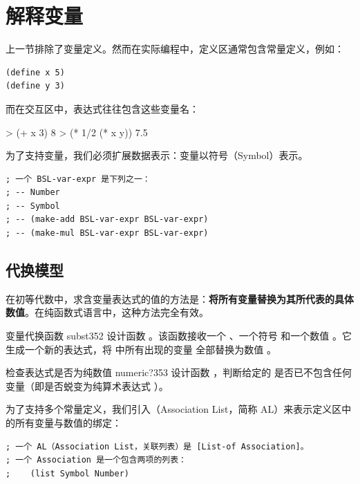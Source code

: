 \section{解释变量 }
\label{sec:21.2_eval_variables}

上一节排除了变量定义。然而在实际编程中，定义区通常包含常量定义，例如：
\begin{lstlisting}[language=BSL]
(define x 5)
(define y 3)
\end{lstlisting}
而在交互区中，表达式往往包含这些变量名：
\begin{replbox}
> (+ x 3)
8
> (* 1/2 (* x y))
7.5
\end{replbox}

为了支持变量，我们必须扩展数据表示：变量以符号（Symbol）表示。

\begin{lstlisting}[language=BSL]
; 一个 BSL-var-expr 是下列之一：
; -- Number
; -- Symbol
; -- (make-add BSL-var-expr BSL-var-expr)
; -- (make-mul BSL-var-expr BSL-var-expr)
\end{lstlisting}

\subsection{代换模型 }

在初等代数中，求含变量表达式的值的方法是：\textbf{将所有变量替换为其所代表的具体数值}。在纯函数式语言中，这种方法完全有效。

\begin{exercise}{变量代换函数 subst}{352}
设计函数 。该函数接收一个 、一个符号  和一个数值 。它生成一个新的表达式，将  中所有出现的变量  全部替换为数值 。
\end{exercise}

\begin{exercise}{检查表达式是否为纯数值 numeric?}{353}
设计函数 ，判断给定的  是否已不包含任何变量（即是否蜕变为纯算术表达式 ）。
\end{exercise}

为了支持多个常量定义，我们引入（Association List，简称 AL）来表示定义区中的所有变量与数值的绑定：

\begin{lstlisting}[language=BSL]
; 一个 AL（Association List，关联列表）是 [List-of Association]。
; 一个 Association 是一个包含两项的列表：
;    (list Symbol Number)
\end{lstlisting}

